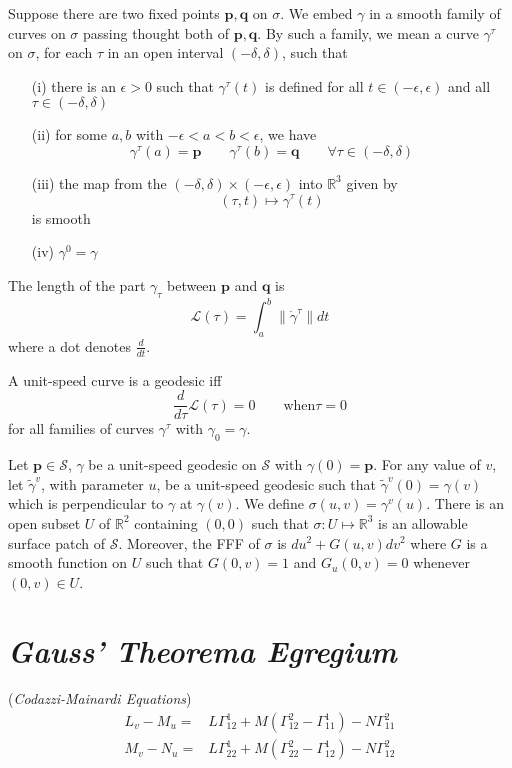 \documentclass[12pt]{article}
\begin{document}
\begin{multicols*}{2}
Suppose there are two fixed points $\mathbf{p}, \mathbf{q}$ on $\sigma$. We embed $\gamma$ in a smooth family of curves on $\sigma$ passing thought both of $\mathbf{p}, \mathbf{q}$. By such a family, we mean a curve $\gamma^\tau$ on $\sigma$, for each $\tau$ in an open interval $(-\delta, \delta)$, such that

\begin{enumerate}
    \item [(i)] there is an $\epsilon > 0$ such that $\gamma^\tau(t)$ is defined for all $t \in (-\epsilon, \epsilon)$ and all $\tau \in (-\delta, \delta)$
    \item [(ii)] for some $a, b$ with $-\epsilon < a < b < \epsilon$, we have \[\gamma^\tau(a) = \mathbf{p} \qquad \gamma^\tau(b) = \mathbf{q} \qquad \forall \tau \in (-\delta, \delta)\]
    \item [(iii)] the map from the $(-\delta, \delta) \times (-\epsilon, \epsilon)$ into $\mathbb{R}^3$ given by \[(\tau, t) \mapsto \gamma^\tau(t)\] is smooth
    \item [(iv)] $\gamma^0 = \gamma$
\end{enumerate}

The length of the part $\gamma_\tau$ between $\mathbf{p}$ and $\mathbf{q}$ is \[\mathcal{L}(\tau) = \int_{a}^{b}\lVert \dot{\gamma}^\tau \rVert dt\]
where a dot denotes $\frac{d}{dt}$.

A unit-speed curve is a geodesic iff \[\frac{d}{d\tau}\mathcal{L}(\tau) = 0 \qquad \text{when} \tau = 0\]
for all families of curves $\gamma^\tau$ with $\gamma_0 = \gamma$.

Let $\mathbf{p} \in \mathcal{S}$, $\gamma$ be a unit-speed geodesic on $\mathcal{S}$ with $\gamma(0) = \mathbf{p}$. For any value of $v$, let $\tilde{\gamma}^v$, with parameter $u$, be a unit-speed geodesic such that $\tilde{\gamma}^v(0) = \gamma(v)$ which is perpendicular to $\gamma$ at $\gamma(v)$. We define $\sigma(u, v) = \gamma^v(u)$. There is an open subset $U$ of $\mathbb{R}^2$ containing $(0,0)$ such that $\sigma: U \mapsto \mathbb{R}^3$ is an allowable surface patch of $\mathcal{S}$. Moreover, the FFF of $\sigma$ is $du^2 + G(u, v)dv^2$ where $G$ is a smooth function on $U$ such that $G(0, v) = 1$ and $G_u(0, v) = 0$ whenever $(0, v) \in U$.

\section*{\textit{Gauss' Theorema Egregium}}

(\textit{Codazzi-Mainardi Equations})
\[\begin{aligned}
    L_v - M_u=&L\Gamma_{12}^1 + M(\Gamma_{12}^2 - \Gamma_{11}^1) - N\Gamma_{11}^2\\
    M_v - N_u=&L\Gamma_{22}^1 + M(\Gamma_{22}^2 - \Gamma_{12}^1) - N\Gamma_{12}^2
\end{aligned}\]


\end{multicols*}
\end{document}
